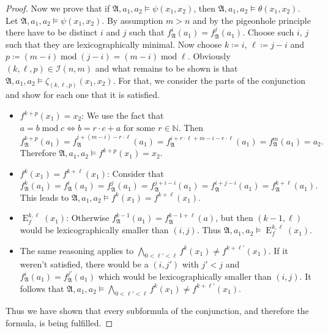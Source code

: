 \begin{proof}
	Now we prove that if $\mathfrak A,a_1,a_2 \models \psi(x_1,x_2)$, then $\mathfrak A,a_1,a_2 \models \theta(x_1,x_2)$. 
	Let $\mathfrak A,a_1,a_2\models \psi(x_1,x_2)$. By assumption $m>n$ and by the pigeonhole principle there have to be distinct $i$ and $j$ such that $f_{\mathfrak A}^{i}(a_1)=f_{\mathfrak A}^{j}(a_1)$.
	Choose such $i$, $j$ such that they are lexicographically minimal.
	Now choose $k\coloneqq i$, $\ell \coloneqq j-i$ and $p\coloneqq (m-i) \operatorname{mod} (j-i)= (m-i) \operatorname{mod} \ell$.
	Obviously $(k,\ell,p)\in\mathcal I(n,m)$ and what remains to be shown is that $\mathfrak A,a_1,a_2\models \zeta_{(k,\ell,p)}(x_1,x_2)$.
	For that, we consider the parts of the conjunction and show for each one that it is satisfied.
	
	\begin{itemize}
		\item $f^{k+p}(x_1)=x_2$:
		We use the fact that $a= b \operatorname{mod} c \Leftrightarrow b = r\cdot c +a \text{ for some } r\in \mathbb N$.
		Then
		$$f_{\mathfrak A}^{k+p}(a_1)=f_{\mathfrak A}^{i+(m-i)-r\cdot \ell}(a_1)=f_{\mathfrak A}^{i+r\cdot \ell + m -i - r\cdot \ell}(a_1)=f_{\mathfrak A}^{m}(a_1)=a_2.$$
		Therefore $\mathfrak A,a_1,a_2\models f^{k+p}(x_1)=x_2$.
		
		\item $f^{k}(x_1)=f^{k+\ell}(x_1)$:
		Consider that
		$$f_{\mathfrak A}^{k}(a_1)=f_{\mathfrak A}^{i}(a_1)=f_{\mathfrak A}^{j}(a_1)=f_{\mathfrak A}^{j+i-i}(a_1)=f_{\mathfrak A}^{i+j-i}(a_1)=f_{\mathfrak A}^{k+\ell}(a_1).$$
		This leads to $\mathfrak A,a_1,a_2\models f^{k}(x_1)=f^{k+\ell}(x_1)$.
		
		\item $\operatorname{E}^{k,\ell}_f(x_1)$:
		Otherwise $f_{\mathfrak A}^{k-1}(a_1)=f_{\mathfrak A}^{k-1+\ell}(a)$, but then $(k-1,\ell)$ would be lexicographically smaller than $(i,j)$.
		Thus $\mathfrak A, a_1,a_2\models \operatorname{E}^{k,\ell}_f(x_1)$.
		
		\item The same reasoning applies to $\bigwedge_{0<\ell'<\ell}f^{k}(x_1)\neq f^{k+\ell'}(x_1)$. 
		If it weren't satisfied, there would be a $(i,j')$ with $j'<j$ and $f_{\mathfrak A}^{i}(a_1)=f_{\mathfrak A}^{j'}(a_1)$ which would be lexicographically smaller than $(i,j)$.
		It follows that $\mathfrak A,a_1,a_2\models \bigwedge_{0<\ell'<\ell}f^{k}(x_1)\neq f^{k+\ell'}(x_1)$.
	\end{itemize}
	
	Thus we have shown that every subformula of the conjunction, and therefore the formula, is being fulfilled.
	

\end{proof}
